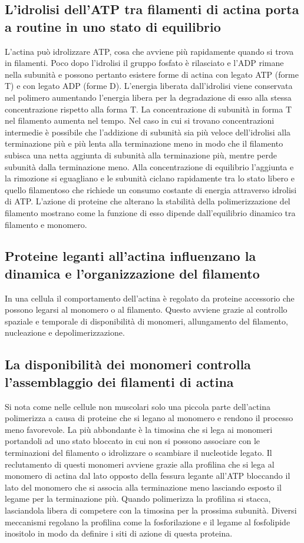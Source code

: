 \subsection{L'idrolisi dell'ATP tra filamenti di actina porta a routine in uno stato di equilibrio}
L'actina pu\`o idrolizzare ATP, cosa che avviene pi\`u rapidamente quando si trova in filamenti. Poco dopo l'idrolisi il gruppo fosfato \`e rilasciato e l'ADP rimane nella subunit\`a e 
possono pertanto esistere forme di actina con legato ATP (forme T) e con legato ADP (forme D). L'energia liberata dall'idrolisi viene conservata nel polimero aumentando l'energia libera
per la degradazione di esso alla stessa concentrazione rispetto alla forma T. La concentrazione di subunit\`a in forma T nel filamento aumenta nel tempo. Nel caso in cui si trovano 
concentrazioni intermedie \`e possibile che l'addizione di subunit\`a sia pi\`u veloce dell'idrolisi alla terminazione pi\`u e pi\`u lenta alla terminazione meno in modo che 
il filamento subisca una netta aggiunta di subunit\`a alla terminazione pi\`u, mentre perde subunit\`a dalla terminazione meno. Alla concentrazione di equilibrio l'aggiunta e la 
rimozione si eguagliano e le subunit\`a ciclano rapidamente tra lo stato libero e quello filamentoso che richiede un consumo costante di energia attraverso idrolisi di ATP. L'azione di 
proteine che alterano la stabilit\`a della polimerizzazione del filamento mostrano come la funzione di esso dipende dall'equilibrio dinamico tra filamento e monomero. 
\subsection{Proteine leganti all'actina influenzano la dinamica e l'organizzazione del filamento}
In una cellula il comportamento dell'actina \`e regolato da proteine accessorio che possono legarsi al monomero o al filamento. Questo avviene grazie al controllo spaziale e temporale
di disponibilit\`a di monomeri, allungamento del filamento, nucleazione e depolimerizzazione. 
\subsection{La disponibilit\`a dei monomeri controlla l'assemblaggio dei filamenti di actina}
Si nota come nelle cellule non muscolari solo una piccola parte dell'actina polimerizza a causa di proteine che si legano al monomero e rendono il processo meno favorevole. La pi\`u 
abbondante \`e la timosina che si lega ai monomeri portandoli ad uno stato bloccato in cui non si possono associare con le terminazioni del filamento o idrolizzare o scambiare il 
nucleotide legato. Il reclutamento di questi monomeri avviene grazie alla profilina che si lega al monomero di actina dal lato opposto della fessura legante all'ATP bloccando il lato
del monomero che si associa alla terminazione meno lasciando esposto il legame per la terminazione pi\`u. Quando polimerizza la profilina si stacca, lasciandola libera di competere con
la timosina per la prossima subunit\`a. Diversi meccanismi regolano la profilina come la fosforilazione e il legame al fosfolipide inositolo in modo da definire i siti di azione di 
questa proteina. 
